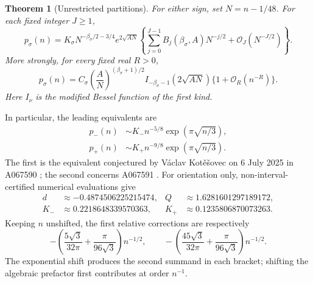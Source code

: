 \documentclass[11pt,letterpaper]{article}
\newtheorem{theorem}{Theorem}[section]
\theoremstyle{remark}\newtheorem{remark}[theorem]{Remark}
\newcommand{\OO}{\mathcal O}
\begin{document}
\begin{theorem}[Unrestricted partitions]\label{oep:thm:unrestricted}
For either sign, set $N=n-1/48$. For each fixed integer $J\geq1$,
\begin{equation}\label{oep:eq:unrestricted}
 p_\sigma(n)=K_\sigma N^{-\beta_\sigma/2-3/4}e^{2\sqrt{AN}}
 \left\{\sum_{j=0}^{J-1}B_j(\beta_\sigma,A)N^{-j/2}
          +\OO_J(N^{-J/2})\right\}.
\end{equation}
More strongly, for every fixed real $R>0$,
\begin{equation}\label{oep:eq:unrestrictedflat}
 p_\sigma(n)=C_\sigma\left(\frac A N\right)^{(\beta_\sigma+1)/2}
 I_{-\beta_\sigma-1}(2\sqrt{AN})\{1+\OO_R(n^{-R})\}.
\end{equation}
Here $I_\nu$ is the modified Bessel function of the first kind.
\end{theorem}
In particular, the leading equivalents are
\begin{align}
 p_-(n)&\sim K_-n^{-5/8}\exp\!\left(\pi\sqrt{n/3}\right),\label{oep:eq:odiouslead}\\
 p_+(n)&\sim K_+n^{-9/8}\exp\!\left(\pi\sqrt{n/3}\right).\label{oep:eq:evillead}
\end{align}
The first is the equivalent conjectured by V\'aclav Kot\v e\v sovec on 6 July 2025 in A067590 \cite{oeis067590}; the second concerns A067591 \cite{oeis067591}. For orientation only, non-interval-certified numerical evaluations give
\[
 \begin{aligned}
 d&\approx-0.4874506225215474,& Q&\approx1.6281601297189172,\\
 K_-&\approx0.2218648339570363,& K_+&\approx0.1235806870073263.
 \end{aligned}
\]
Keeping $n$ unshifted, the first relative corrections are respectively
\begin{equation}\label{oep:eq:firstcorrections}
 -\left(\frac{5\sqrt3}{32\pi}+\frac{\pi}{96\sqrt3}\right)n^{-1/2},
 \qquad
 -\left(\frac{45\sqrt3}{32\pi}+\frac{\pi}{96\sqrt3}\right)n^{-1/2}.
\end{equation}
The exponential shift produces the second summand in each bracket; shifting the algebraic prefactor first contributes at order $n^{-1}$.
\end{document}
